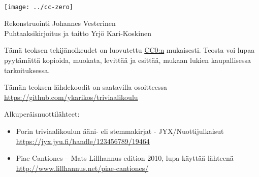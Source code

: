\newpage
~\vfill
\thispagestyle{empty}
\setlength{\parindent}{0pt}
\setlength{\parskip}{\baselineskip}

\the\year

\texttt{[image: ../cc-zero]}

Rekonstruointi Johannes Vesterinen \\
Puhtaaksikirjoitus ja taitto Yrjö Kari-Koskinen

Tämä teoksen tekijänoikeudet on luovutettu \href{https://creativecommons.org/publicdomain/zero/1.0/deed.fi}{CC0:n} mukaisesti. Teosta voi lupaa pyytämättä kopioida, muokata, levittää ja esittää, mukaan lukien kaupallisessa tarkoituksessa.

Tämän teoksen lähdekoodit on saatavilla osoitteessa \url{https://github.com/ykarikos/triviaalikoulu}

Alkuperäisnuottilähteet:
\begin{itemize}
\item Porin triviaalikoulun ääni- eli stemmakirjat - JYX/Nuottijulkaisut \\ \url{https://jyx.jyu.fi/handle/123456789/19464}
\item Piae Cantiones – Mats Lillhannus edition 2010, lupa käyttää lähteenä \\ \url{http://www.lillhannus.net/piae-cantiones/}
\end{itemize}

